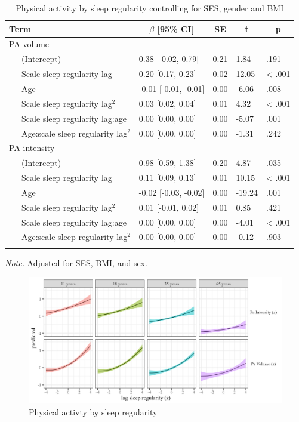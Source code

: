\documentclass[
  man]{apa6}
\begin{document}
\begin{table}[tbp]

\begin{center}
\begin{threeparttable}

\caption{\label{tab:PA-by-sleep-regularity}Physical activity by sleep regularity controlling for SES, gender and BMI}

\begin{tabular}{lllll}
\toprule
Term & \multicolumn{1}{c}{$\beta$ [95\% CI]} & \multicolumn{1}{c}{SE} & \multicolumn{1}{c}{t} & \multicolumn{1}{c}{p}\\
\midrule
PA volume &  &  &  & \\
\ \ \ (Intercept) & 0.38 [-0.02, 0.79] & 0.21 & 1.84 & .191\\
\ \ \ Scale sleep regularity lag & 0.20 [0.17, 0.23] & 0.02 & 12.05 & < .001\\
\ \ \ Age & -0.01 [-0.01, -0.01] & 0.00 & -6.06 & .008\\
\ \ \ Scale sleep regularity lag$^2$ & 0.03 [0.02, 0.04] & 0.01 & 4.32 & < .001\\
\ \ \ Scale sleep regularity lag:age & 0.00 [0.00, 0.00] & 0.00 & -5.07 & .001\\
\ \ \ Age:scale sleep regularity lag$^2$ & 0.00 [0.00, 0.00] & 0.00 & -1.31 & .242\\
PA intensity &  &  &  & \\
\ \ \ (Intercept) & 0.98 [0.59, 1.38] & 0.20 & 4.87 & .035\\
\ \ \ Scale sleep regularity lag & 0.11 [0.09, 0.13] & 0.01 & 10.15 & < .001\\
\ \ \ Age & -0.02 [-0.03, -0.02] & 0.00 & -19.24 & .001\\
\ \ \ Scale sleep regularity lag$^2$ & 0.01 [-0.01, 0.02] & 0.01 & 0.85 & .421\\
\ \ \ Scale sleep regularity lag:age & 0.00 [0.00, 0.00] & 0.00 & -4.01 & < .001\\
\ \ \ Age:scale sleep regularity lag$^2$ & 0.00 [0.00, 0.00] & 0.00 & -0.12 & .903\\
\bottomrule
\addlinespace
\end{tabular}

\begin{tablenotes}[para]
\normalsize{\textit{Note.} Adjusted for SES, BMI, and sex. }
\end{tablenotes}

\end{threeparttable}
\end{center}

\end{table}

\begin{figure}
\includegraphics[width=7.08in]{../Figures/Pa on sleep_regularity_lag} \caption{Physical activty by sleep regularity}\label{fig:PA-by-sleep-regularity-fig}
\end{figure}
\end{document}
